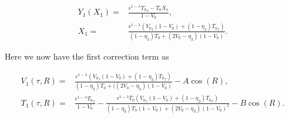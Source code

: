 \begin{equation*}
\begin{aligned}
Y_1(X_1) =& \frac{\epsilon^{1-\lambda}{T_0}_\tau-T_0X_1}{1-V_0},\\
X_1=&\frac{\epsilon^{1-\lambda}({V_0}_\tau(1-V_0)+(1-\eta_3){T_0}_\tau)}{(1-\eta_3)T_0+(2V_0-\eta_3)(1-V_0)}.
\end{aligned}
\end{equation*}

Here we now have the first correction term as

\begin{equation*}
\begin{aligned}
V_1(\tau,R)=& \frac{\epsilon^{1-\lambda}({V_0}_\tau(1-V_0)+(1-\eta_3){T_0}_\tau)}{(1-\eta_3)T_0+((2V_0-\eta_3)(1-V_0)}-A\cos(R),\\
T_1(\tau,R)=&\frac{\epsilon^{1-\lambda}{T_0}_\tau}{1-V_0}-\frac{\epsilon^{1-\lambda}T_0({V_0}_\tau(1-V_0)+(1-\eta_3){T_0}_\tau)}{(1-\eta_3)T_0(1-V_0)+(2V_0-\eta_3)(1-V_0)^2}-B\cos(R).
\end{aligned}
\end{equation*}